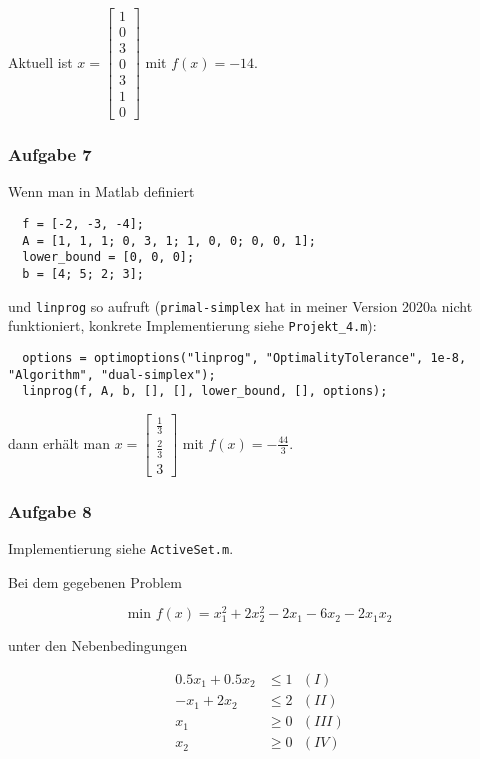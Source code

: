 \documentclass[a4paper, 12pt]{report}
\begin{document}
Aktuell ist $x = \begin{bmatrix} 1\\0\\3\\0\\3\\1\\0 \end{bmatrix}$ mit $f(x) = -14$.

\subsubsection{Aufgabe 7}
Wenn man in Matlab definiert

\begin{lstlisting}
  f = [-2, -3, -4];
  A = [1, 1, 1; 0, 3, 1; 1, 0, 0; 0, 0, 1];
  lower_bound = [0, 0, 0];
  b = [4; 5; 2; 3];\end{lstlisting}

und \lstinline[basicstyle=\ttfamily\color{black}]|linprog| so aufruft
(\lstinline[basicstyle=\ttfamily\color{black}]|primal-simplex| hat in meiner Version 2020a nicht funktioniert,
konkrete Implementierung siehe \lstinline[basicstyle=\ttfamily\color{black}]|Projekt_4.m|):

\begin{lstlisting}
  options = optimoptions("linprog", "OptimalityTolerance", 1e-8, "Algorithm", "dual-simplex");
  linprog(f, A, b, [], [], lower_bound, [], options);\end{lstlisting}

dann erhält man $x = \begin{bmatrix}\frac{1}{3}\\[6pt]\frac{2}{3}\\[6pt]3\end{bmatrix}$ mit $f(x) = -\frac{44}{3}$.

\subsubsection{Aufgabe 8}
Implementierung siehe \lstinline[basicstyle=\ttfamily\color{black}]|ActiveSet.m|.\par
Bei dem gegebenen Problem

$$ \text{min } f(x) = x_1^2 + 2x_2^2 - 2x_1 - 6x_2 - 2x_1x_2 $$

unter den Nebenbedingungen

\begin{align*} 
  0.5x_1 + 0.5x_2 &\leq 1 \text{  } (I)\\
  -x_1 + 2x_2 &\leq 2 \text{  } (II)\\
  x_1 &\geq 0 \text{  } (III)\\
  x_2 &\geq 0 \text{  } (IV)
\end{align*}
\end{document}
